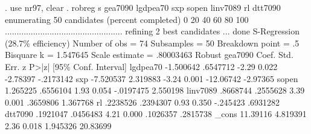 . use nr97, clear
{\smallskip}
. robreg s gea7090 lgdpea70 sxp sopen linv7089 rl dtt7090
{\smallskip}
enumerating 50 candidates (percent completed)
0  20  40  60  80  100
..................................................
{\smallskip}
refining 2 best candidates ... done
{\smallskip}
S-Regression (28.7\% efficiency)                 Number of obs     =         74
                                                  Subsamples      =         50
                                                  Breakdown point =         .5
                                                  Bisquare k      =   1.547645
                                                  Scale estimate  =  .80003463
{\smallskip}
             {\VBAR}               Robust
     gea7090 {\VBAR}      Coef.   Std. Err.      z    P>|z|     [95\% Conf. Interval]
    lgdpea70 {\VBAR}  -1.500642   .6547712    -2.29   0.022     -2.78397   -.2173142
         sxp {\VBAR}  -7.520537   2.319883    -3.24   0.001    -12.06742    -2.97365
       sopen {\VBAR}   1.265225   .6556104     1.93   0.054    -.0197475    2.550198
    linv7089 {\VBAR}   .8668744   .2555628     3.39   0.001     .3659806    1.367768
          rl {\VBAR}   .2238526   .2394307     0.93   0.350     -.245423    .6931282
     dtt7090 {\VBAR}   .1921047   .0456483     4.21   0.000     .1026357    .2815738
       _cons {\VBAR}   11.39116   4.819391     2.36   0.018     1.945326    20.83699
{\smallskip}
